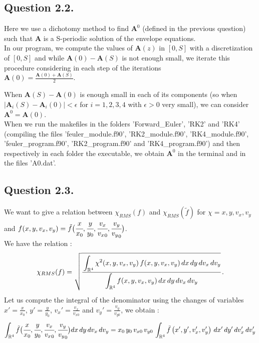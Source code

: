 \documentclass[10pt]{article}
\newcommand{\R}{{\mathbb R}}
\begin{document}
\subsection{Question 2.2.}


Here we use a dichotomy method to find $\mathbf{A}^0$ (defined in the previous question) such that $\mathbf{A}$ is a S-periodic solution of the envelope equations. \\

In our program, we compute the values of $\mathbf{A}(z)$ in $[0,S]$ with a discretization of $[0,S]$ and while $\mathbf{A}(0)-\mathbf{A}(S)$ is not enough small, we iterate this procedure considering in each step of the iterations \\ $\mathbf{A}(0)=\frac{\mathbf{A}(0)+\mathbf{A}(S)}{2}$.


When $\mathbf{A}(S)-\mathbf{A}(0)$ is enough small in each of its components (so when $|\mathbf{A}_i(S)-\mathbf{A}_i(0)| < \epsilon$ for $i=1,2,3,4$ with $\epsilon > 0$ very small), we can consider $\mathbf{A}^0=\mathbf{A}(0)$. \\

When we run the makefiles in the folders 'Forward\_Euler', 'RK2' and 'RK4' (compiling the files 'feuler\_module.f90', 'RK2\_module.f90', 'RK4\_module.f90', 'feuler\_program.f90', 'RK2\_program.f90' and 'RK4\_program.f90') and then respectively in each folder the executable, we obtain $\mathbf{A}^0$ in the terminal and in the files 'A0.dat'.


\subsection{Question 2.3.}


We want to give a relation between $\chi_{RMS}(f)$ and $\chi_{RMS}(\tilde{f})$ for $\chi = x, y, v_x, v_y$ and $f(x,y,v_{x},v_{y}) = \tilde{f}\big(\cfrac{x}{x_{0}},\cfrac{y}{y_{0}},\cfrac{v_{x}}{{v_{x}}_{0}}, \cfrac{v_{y}}{{v_{y}}_{0}}\big)$. \\
We have the relation :
$$
\chi_{RMS}(f) = \sqrt{\cfrac{\displaystyle \int_{\R^{4}} \chi^{2}(x,y,v_{x},v_{y})\, f(x,y,v_{x},v_{y})\, dx\, dy\,dv_{x}\, dv_{y}}{\displaystyle \int_{\R^{4}} f(x,y,v_{x},v_{y})\, dx\, dy\,dv_{x}\, dv_{y}}} \, .
$$
Let us compute the integral of the denominator using the changes of variables $x' = \frac{x}{x_0}$, $y' = \frac{y}{y_0}$, $v_x' = \frac{v_x}{v_{x0}}$ and $v_y' = \frac{v_y}{v_{y0}}$, we obtain :
$$
\int_{\R^{4}} \tilde{f}\big(\cfrac{x}{x_{0}},\cfrac{y}{y_{0}},\cfrac{v_{x}}{{v_{x}}_{0}}, \cfrac{v_{y}}{{v_{y}}_{0}}\big) dx\, dy\,dv_{x}\, dv_{y} = x_0\,y_0\,v_{x0}\,v_{y0}\,\int_{\R^{4}} \tilde{f}\left(x',y',v_x',v_y'\right)\,dx'\, dy'\,dv_{x}'\, dv_{y}'
$$
\end{document}
